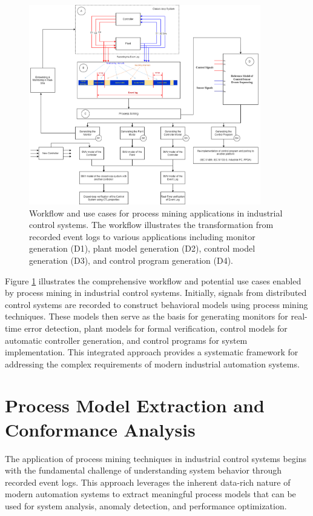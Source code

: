 \begin{figure}[!t]
	\centering
	\includegraphics[width=0.9\textwidth]{chapters/images/chapter4/workflow1.png}
	\caption{Workflow and use cases for process mining applications in industrial control systems. The workflow illustrates the transformation from recorded event logs to various applications including monitor generation (D1), plant model generation (D2), control model generation (D3), and control program generation (D4).}
	\label{workflowUsecase}
\end{figure}

Figure \ref{workflowUsecase} illustrates the comprehensive workflow and potential use cases enabled by process mining in industrial control systems. Initially, signals from distributed control systems are recorded to construct behavioral models using process mining techniques. These models then serve as the basis for generating monitors for real-time error detection, plant models for formal verification, control models for automatic controller generation, and control programs for system implementation. This integrated approach provides a systematic framework for addressing the complex requirements of modern industrial automation systems.

\section{Process Model Extraction and Conformance Analysis}

The application of process mining techniques in industrial control systems begins with the fundamental challenge of understanding system behavior through recorded event logs. This approach leverages the inherent data-rich nature of modern automation systems to extract meaningful process models that can be used for system analysis, anomaly detection, and performance optimization.

